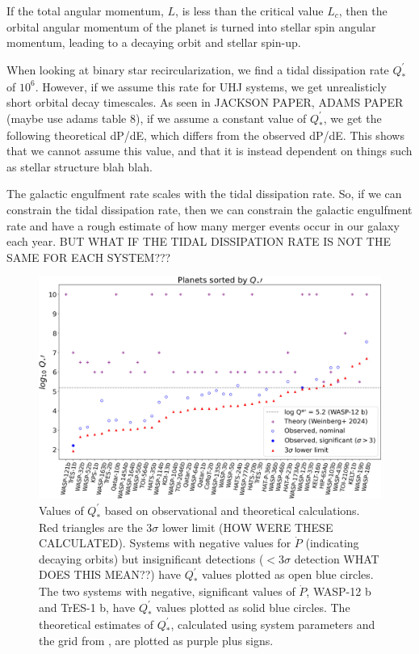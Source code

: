 \documentclass[oneside,12pt]{amsart}
\numberwithin{page}{section}
\begin{document}
If the total angular momentum, $L$, is less than the critical value $L_c$, then the orbital angular momentum of the planet is turned into stellar spin angular momentum, leading to a decaying orbit and stellar spin-up. 

When looking at binary star recircularization, we find a tidal dissipation rate $Q^{'}_{*}$ of $10^6$. However, if we assume this rate for UHJ systems, we get unrealisticly short orbital decay timescales. As seen in JACKSON PAPER, ADAMS PAPER (maybe use adams table 8), if we assume a constant value of $Q^{'}_{*}$, we get the following theoretical dP/dE, which differs from the observed dP/dE. This shows that we cannot assume this value, and that it is instead dependent on things such as stellar structure blah blah. 

The galactic engulfment rate scales with the tidal dissipation rate. So, if we can constrain the tidal dissipation rate, then we can constrain the galactic engulfment rate and have a rough estimate of how many merger events occur in our galaxy each year. BUT WHAT IF THE TIDAL DISSIPATION RATE IS NOT THE SAME FOR EACH SYSTEM??? 

\begin{figure}[htbp]
    \centering
    \includegraphics[width=\linewidth]{figs/adams_fig11.jpg}
    \caption{Values of $Q^{'}_*$ based on observational and theoretical calculations. Red triangles are the $3\sigma$ lower limit (HOW WERE THESE CALCULATED). Systems with negative values for $\dot{P}$ (indicating decaying orbits) but insignificant detections ($<3\sigma$ detection WHAT DOES THIS MEAN??) have $Q^{'}_*$ values plotted as open blue circles. The two systems with negative, significant values of $\dot{P}$, WASP-12 b and TrES-1 b, have $Q^{'}_*$ values plotted as solid blue circles. The theoretical estimates of $Q^{'}_*$, calculated using system parameters and the grid from \citet{weinberg2023orbital}, are plotted as purple plus signs.}
    \label{fig:adams-fig11}
\end{figure}
\end{document}
